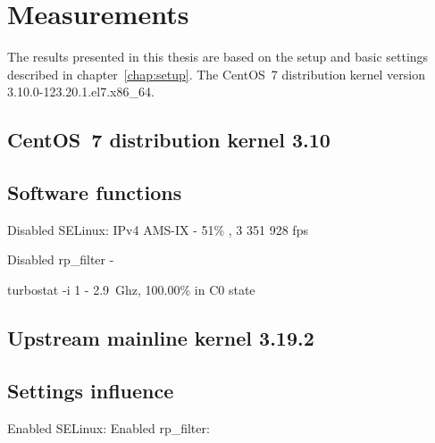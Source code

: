 
\chapter{Measurements}\label{chap:measurements}
The results presented in this thesis are based on the setup and basic settings described in chapter~\ref{chap:setup}.
The CentOS~7 distribution kernel version 3.10.0-123.20.1.el7.x86\_64.

\section{CentOS~7 distribution kernel 3.10}


















\section{Software functions}

Disabled SELinux:
IPv4 AMS-IX - 51\% , 3 351 928 fps

Disabled rp\_filter -

turbostat -i 1 - 2.9~Ghz, 100.00\% in C0 state



\section{Upstream mainline kernel 3.19.2}






\section{Settings influence}
Enabled SELinux:
Enabled rp\_filter:

